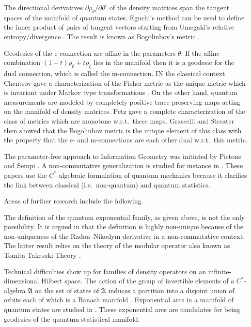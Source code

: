 \documentclass[a4paper,10pt]{article}
\begin{document}
The directional derivatives $\partial\rho_\theta/\partial\theta^i$ of the density matrices
span the tangent spaces of the manifold of quantum states.
Eguchi's method \cite{ES85} can be used to define the inner product
of pairs of tangent vectors starting from Umegaki's relative entropy/divergence \cite{UH62}.
The result is known as Bogoliubov's metric \cite{PT93}.

Geodesics of the e-connection are affine in the parameters $\theta$.
If the affine combination $(1-t)\rho_\theta+t\rho_\zeta$ lies in the manifold
then it is a geodesic for the dual connection, which is called the m-connection.
IN the classical context
Chentsov \cite {CNN82} gave a characterization of the Fisher metric 
as the unique metric which is invariant
under Markov type transformations \cite {FA22}. 
On the other hand, quantum measurements are modeled by completely-positive trace-preserving maps 
acting on the manifold of density matrices. Petz \cite{PD86,PS96} gave a complete characterization
of the class of metrics which are monotone w.r.t.~these maps.
Grasselli and Streater \cite{GS01} then showed that the Bogoliubov metric is the unique element of this class
with the property that the e- and m-connections are each other dual w.r.t.~this metric.

The parameter-free approach to Information Geometry was initiated by
Pistone and Sempi \cite{PS95}. A non-commutative generalization
is studied for instance in \cite{JA01,SRF04a,SRF04b,JA06}.
These papers use the $C^*$-algebraic formulation of quantum mechanics because it
clarifies the link between classical (i.e.~non-quantum) and quantum statistics.

Areas of further research include the following.

The definition of the quantum exponential family, as given above, is not the only possibility.
It is argued in \cite{NJ22,NJ23} that the definition is highly non-unique
because of the non-uniqueness \cite{AH74} of the Radon–Nikodym derivative in a non-commutative context. 
The latter result relies on the theory of the modular operator also known as Tomita-Takesaki Theory \cite{TM70,BR87}.

Technical difficulties show up for families of density operators on an infinite-dimensional Hilbert space.
The action of the group of invertible elements of a $C^*$-algebra $\mathfrak A$ on the set
of states of $\mathfrak A$ 
induces a partition into a disjoint union of orbits each of which is a Banach manifold \cite {CIJM19}.
Exponential arcs in a manifold of quantum states are studied in \cite{NJ22,NJ23}.
These exponential arcs are candidates for being geodesics of the quantum statistical manifold.
\end{document}
